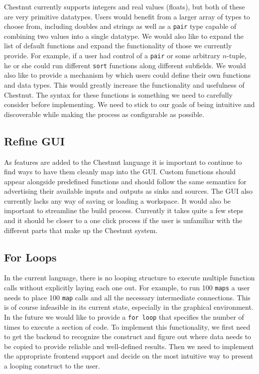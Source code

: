 \documentclass[twocolumn]{article}
\renewcommand{\|}{\origbar} %
\newcommand{\code}[1]{\texttt{#1}}
\begin{document}
Chestnut currently supports integers and real values (floats), but both of these are very primitive datatypes. Users would benefit from a larger array of types to choose from, including doubles and strings as well as a \code{pair} type capable of combining two values into a single datatype. We would also like to expand the list of default functions and expand the functionality of those we currently provide. For example, if a user had control of a \code{pair} or some arbitrary $n$-tuple, he or she could run different \code{sort} functions along different subfields. We would also like to provide a mechanism by which users could define their own functions and data types. This would greatly increase the functionality and usefulness of Chestnut. The syntax for these functions is something we need to carefully consider before implementing. We need to stick to our goals of being intuitive and discoverable while making the process as configurable as possible.

\subsection{Refine GUI}

As features are added to the Chestnut language it is important to continue to find ways to have them cleanly map into the GUI. Custom functions should appear alongside predefined functions and should follow the same semantics for advertising their available inputs and outputs as sinks and sources. The GUI also currently lacks any way of saving or loading a workspace. It would also be important to streamline the build process. Currently it takes quite a few steps and it should be closer to a one click process if the user is unfamiliar with the different parts that make up the Chestnut system.

\subsection{For Loops}

In the current language, there is no looping structure to execute multiple function calls without explicitly laying each one out. For example, to run 100 \code{maps} a user needs to place 100 \code{map} calls and all the necessary intermediate connections. This is of course infeasible in its current state, especially in the graphical environment. In the future we would like to provide a \code{for loop} that specifies the number of times to execute a section of code. To implement this functionality, we first need to get the backend to recognize the construct and figure out where data needs to be copied to provide reliable and well-defined results. Then we need to implement the appropriate frontend support and decide on the most intuitive way to present a looping construct to the user.



\end{document}
